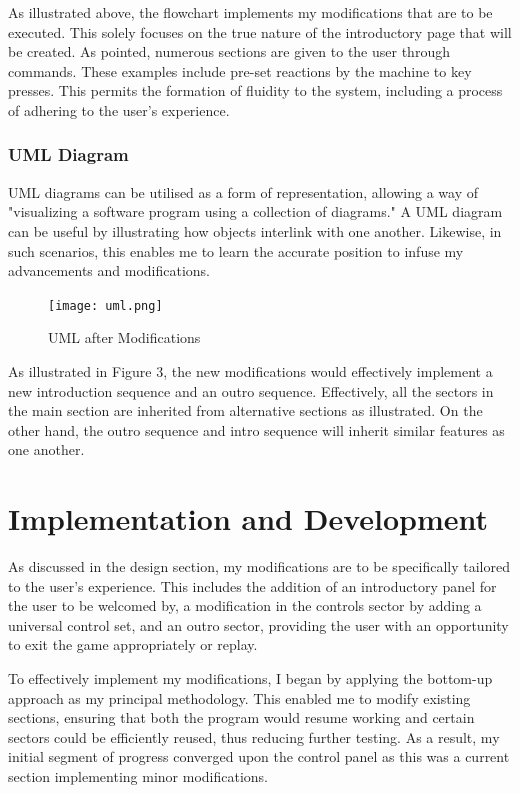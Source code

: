 \documentclass{article}
\begin{document}
As illustrated above, the flowchart implements my modifications that are to be executed. This solely focuses on the true nature of the introductory page that will be created. As pointed, numerous sections are given to the user through commands. These examples include pre-set reactions by the machine to key presses. This permits the formation of fluidity to the system, including a process of adhering to the user's experience.


\subsubsection{UML Diagram}\label{sec:uml}
UML diagrams can be utilised as a form of representation, allowing a way of "visualizing a software program using a collection of diagrams." \cite{UML} A UML diagram can be useful by illustrating how objects interlink with one another.  Likewise, in such scenarios, this enables me to learn the accurate position to infuse my advancements and modifications.

\begin{figure}[H]
    \centering
    \texttt{[image: uml.png]}
    \caption[UML after Modifications]{UML after Modifications}
    \label{fig:uml}
\end{figure}

As illustrated in Figure 3, the new modifications would effectively implement a new introduction sequence and an outro sequence. Effectively, all the sectors in the main section are inherited from alternative sections as illustrated. On the other hand, the outro sequence and intro sequence will inherit similar features as one another.

\section{Implementation and Development}
As discussed in the design section, my modifications are to be specifically tailored to the user's experience. This includes the addition of an introductory panel for the user to be welcomed by, a modification in the controls sector by adding a universal control set, and an outro sector, providing the user with an opportunity to exit the game appropriately or replay.

To effectively implement my modifications, I began by applying the bottom-up approach as my principal methodology. This enabled me to modify existing sections, ensuring that both the program would resume working and certain sectors could be efficiently reused, thus reducing further testing. As a result, my initial segment of progress converged upon the control panel as this was a current section implementing minor modifications.
\end{document}
